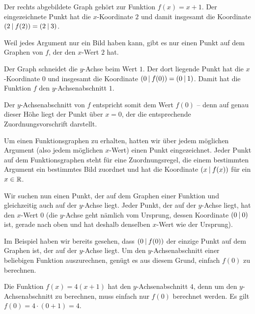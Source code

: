 \documentclass[../../main.tex]{subfiles}
\begin{document}
\begin{example}{}
    Der rechts abgebildete Graph gehört zur Funktion \mbox{$f(x)=x+1$}. Der eingezeichnete Punkt hat die $x$-Koordinate $2$ und damit insgesamt die Koordinate $\left(2 \:\middle|\: f(2)\right)=\left(2 \:\middle|\: 3\right)$. 
    
    Weil jedes Argument nur ein Bild haben kann, gibt es nur einen Punkt auf dem Graphen von $f$, der den $x$-Wert $2$ hat.
    
    Der Graph schneidet die $y$-Achse beim Wert $1$. Der dort liegende Punkt hat die $x$-Koordinate $0$ und insgesamt die Koordinate $\left(0 \:\middle|\: f(0)\right)=\left(0 \:\middle|\: 1\right)$. Damit hat die Funktion $f$ den $y$-Achsenabschnitt $1$.
    
    Der $y$-Achsenabschnitt von $f$ entspricht somit dem Wert $f(0)$ -- denn auf genau dieser Höhe liegt der Punkt über $x=0$, der die entsprechende Zuordnungsvorschrift darstellt.
\end{example}

Um einen Funktionsgraphen zu erhalten, hatten wir über jedem möglichen Argument (also jedem möglichen $x$-Wert) einen Punkt eingezeichnet. Jeder Punkt auf dem Funktionsgraphen steht für eine Zuordnungsregel, die einem bestimmten Argument ein bestimmtes Bild zuordnet und hat die Koordinate $\left(x \:\middle|\: f(x)\right)$ für ein $x\in\mathbb{R}$.

Wir suchen nun einen Punkt, der auf dem Graphen einer Funktion und gleichzeitig auch auf der $y$-Achse liegt. Jeder Punkt, der auf der $y$-Achse liegt, hat den $x$-Wert $0$ (die $y$-Achse geht nämlich vom Ursprung, dessen Koordinate $\left(0 \:\middle|\: 0\right)$ ist, gerade nach oben und hat deshalb denselben $x$-Wert wie der Ursprung). 

Im Beispiel haben wir bereits gesehen, dass $\left(0 \:\middle|\: f(0)\right)$ der einzige Punkt auf dem Graphen ist, der auf der $y$-Achse liegt. Um den $y$-Achsenabschnitt einer beliebigen Funktion auszurechnen, genügt es aus diesem Grund, einfach $f(0)$ zu berechnen.

\begin{example}{}
    \sloppy
    Die Funktion $f(x)=4(x+1)$ hat den $y$-Achsenabschnitt $4$, denn um den $y$-Achsenabschnitt zu berechnen, muss einfach nur $f(0)$ berechnet werden. Es gilt $f(0)=4\cdot (0+1)=4$.
\end{example}
\end{document}
